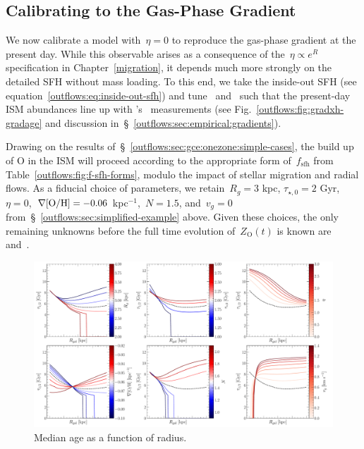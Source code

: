 \subsection{Calibrating to the Gas-Phase Gradient}
\label{outflows:sec:calibrated-model}

We now calibrate a model with~$\eta = 0$ to reproduce the gas-phase gradient at
the present day.
While this observable arises as a consequence of the~$\eta \propto e^R$
specification in Chapter~\ref{migration}, it depends much more strongly on the
detailed SFH without mass loading.
To this end, we take the inside-out SFH (see
equation~\ref{outflows:eq:inside-out-sfh}) and tune~
and~ such that the present-day ISM abundances line up with
\citeauthor{MendezDelgado2022}'s~\citeyearpar{MendezDelgado2022} measurements
(see Fig.~\ref{outflows:fig:gradxh-gradage} and discussion
in~\S~\ref{outflows:sec:empirical:gradients}).
\par
Drawing on the results of~\S~\ref{outflows:sec:gce:onezone:simple-cases}, the
build up of O in the ISM will proceed according to the appropriate form
of~$f_\text{sfh}$ from Table~\ref{outflows:fig:f-sfh-forms}, modulo the impact
of stellar migration and radial flows.
As a fiducial choice of parameters, we retain~$R_g = 3$ kpc,
$\tau_{\star,0} = 2$ Gyr,~$\eta = 0$,~$\nabla\text{[O/H]} = -0.06$ kpc$^{-1}$,~$N = 1.5$,
and~$v_g = 0$ from~\S~\ref{outflows:sec:simplified-example} above.
Given these choices, the only remaining unknowns before the full time evolution
of~$Z_\text{O}(t)$ is known are~ and~.

\begin{landscape}
\begin{figure}
\centering
\includegraphics[scale = 0.4]{medage_inputparams.pdf}
\caption{
Median age as a function of radius.
}
\label{outflows:fig:medage-inputparams}
\end{figure}
\end{landscape}

